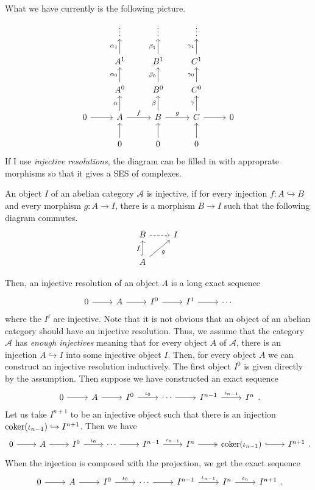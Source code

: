 What we have currently is the following picture.
\[\begin{tikzcd}
    & \vdots & \vdots & \vdots & \\
    & A^{1}\uar{\alpha_{1}} & B^{1}\uar{\beta_{1}} & C^{1}\uar{\gamma_{1}} & \\
    & A^{0}\uar{\alpha_{0}} & B^{0}\uar{\beta_{0}} & C^{0}\uar{\gamma_{0}} & \\
    0\rar& A\rar{f}\uar{\alpha} & B\rar{g}\uar{\beta} & C\rar\uar{\gamma}&0\\
    & 0\uar & 0\uar & 0\uar &
  \end{tikzcd}\]
If I use \emph{injective resolutions}, the diagram can be filled in with
approprate morphisms so that it gives a SES of complexes.
\begin{defin}
  An object $I$ of an abelian category $\mathcal{A}$ is injective,
  if for every injection $f:A\hookrightarrow B$ and every morphism
  $g:A\to I$, there is a morphism $B\to I$ such that the following
  diagram commutes.
  \[\begin{tikzcd}
      B\rar[dashed] & I \\
      A\uar[hook]{f}\arrow["g"']{ur}
    \end{tikzcd}\]
\end{defin}
Then, an injective resolution of an object $A$ is a long exact sequence
\[\begin{tikzcd}
    0\rar & A\rar & I^{0}\rar & I^{1}\rar & \cdots
  \end{tikzcd}\]
where the $I^{i}$ are injective. Note that it is not obvious that an object
of an abelian category should have an injective resolution. Thus, we assume
that the category $\mathcal{A}$ has \emph{enough injectives} meaning that
for every object $A$ of $\mathcal{A}$, there is an injection
$A\hookrightarrow I$ into some injective object $I$. Then, for every object
$A$ we can construct an injective resolution inductively. The first object
$I^{0}$ is given directly by the assumption. Then suppose we have constructed
an exact sequence
\[\begin{tikzcd}
    0\rar & A\rar & I^{0}\rar{\iota_{0}} & \cdots\rar
    & I^{n-1}\rar{\iota_{n-1}} & I^{n}
  \end{tikzcd}.\]
Let us take $I^{n+1}$ to be an injective object such that there is
an injection $\operatorname{coker}(\iota_{n-1})\hookrightarrow I^{n+1}$. Then we have
\[\begin{tikzcd}
    0\rar & A\rar & I^{0}\rar{\iota_{0}} & \cdots\rar
    & I^{n-1}\rar{\iota_{n-1}} & I^{n}\rar[two heads]
    & \coker(\iota_{n-1})\rar[hook] & I^{n+1}
  \end{tikzcd}.\]
When the injection is composed with the projection, we get the exact sequence
\[\begin{tikzcd}
    0\rar & A\rar & I^{0}\rar{\iota_{0}} & \cdots\rar
    & I^{n-1}\rar{\iota_{n-1}} & I^{n}\rar{\iota_{n}} & I^{n+1}
  \end{tikzcd}.\]

